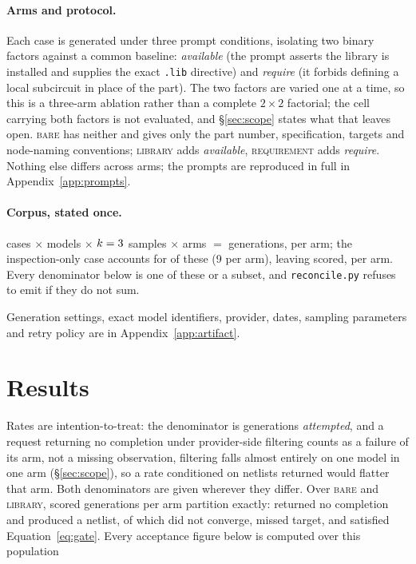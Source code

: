 \paragraph{Arms and protocol.}
Each case is generated under three prompt conditions, isolating two binary
factors against a common baseline: \emph{available} (the prompt asserts the
library is installed and supplies the exact \texttt{.lib} directive) and
\emph{require} (it forbids defining a local subcircuit in place of the part).
The two factors are varied one at a time, so this is a three-arm ablation
rather than a complete $2\times2$ factorial; the cell carrying both factors
is not evaluated, and \S\ref{sec:scope} states what that leaves open.
\textsc{bare} has neither and gives only the part number, specification,
targets and node-naming conventions; \textsc{library} adds \emph{available},
\textsc{requirement} adds \emph{require}. Nothing else differs across arms;
the prompts are reproduced in full in Appendix~\ref{app:prompts}.

\paragraph{Corpus, stated once.}
\NumCases{} cases $\times$ \NumModels{} models $\times$
$k=3{}$ samples $\times$ \CorpusArms{} arms $=$ \CorpusTotal{}
generations, \ArmAttempted{} per arm; the inspection-only case accounts for
\CorpusExcluded{} of these (9 per arm), leaving \CorpusScored{} scored,
\ArmScored{} per arm. Every denominator below is one of these or a subset, and
\texttt{reconcile.py} refuses to emit if they do not sum.

Generation settings, exact model identifiers, provider, dates, sampling
parameters and retry policy are in Appendix~\ref{app:artifact}.

\section{Results}
\label{sec:results}

Rates are intention-to-treat: the denominator is generations
\emph{attempted}, and a request returning no completion under provider-side
filtering counts as a failure of its arm, not a missing observation,
filtering falls almost entirely on one model in one arm
(\S\ref{sec:scope}), so a rate conditioned on netlists returned would flatter
that arm. Both denominators are given wherever they differ. Over
\textsc{bare} and \textsc{library}, \ArmScored{} scored generations per arm
partition exactly: \NumNoCompletion{} returned no completion and
\NumNetlists{} produced a netlist, of which \NumNotConverged{} did not
converge, \NumNumericFail{} missed target, and \NumNumericPass{} satisfied
Equation~\ref{eq:gate}. Every acceptance figure below is computed over this population

